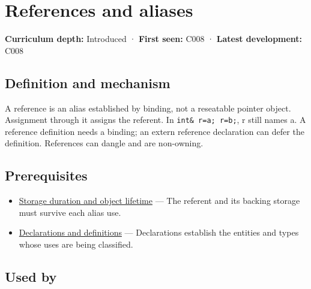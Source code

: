 \hypertarget{appendix-d6d562ca9fbb}{}\label{referencestart:appendix-d6d562ca9fbb}
\section{References and aliases}\label{appendix-d6d562ca9fbb-references-and-aliases}

\hypertarget{appendix-d6d562ca9fbb-references-and-aliases}{}

\textbf{Curriculum depth:} Introduced · \textbf{First seen:} C008 · \textbf{Latest development:} C008

\begin{allmightroledefinition}

\subsection{Definition and mechanism}\label{appendix-d6d562ca9fbb-definition-and-mechanism}

\hypertarget{appendix-d6d562ca9fbb-definition-and-mechanism}{}

A reference is an alias established by binding, not a reseatable pointer object. Assignment through it assigns the referent. In \texttt{int\&\ r=a;\ r=b;}, r still names a. A reference definition needs a binding; an extern reference declaration can defer the definition. References can dangle and are non-owning.

\end{allmightroledefinition}

\subsection{Prerequisites}\label{appendix-d6d562ca9fbb-prerequisites}

\hypertarget{appendix-d6d562ca9fbb-prerequisites}{}

\begin{itemize}
\tightlist
\item
  \hyperref[appendix-0b104bcba06b]{Storage duration and object lifetime} --- The referent and its backing storage must survive each alias use.
\item
  \hyperref[appendix-2e4d494c2d94]{Declarations and definitions} --- Declarations establish the entities and types whose uses are being classified.
\end{itemize}

\subsection{Used by}\label{appendix-d6d562ca9fbb-used-by}

